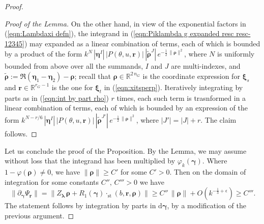 \documentclass[10pt,a4paper]{amsart}
\begin{document}
\begin{proof}
\begin{proof}[Proof of the Lemma]
On the other hand, in view of the exponential factors in (\ref{eqn:Lambdaxi defn}), the integrand in 
(\ref{eqn:Piklambda g expanded resc resc-12345})
may expanded as a linear combination of terms, each of which
is bounded by a product of the form
$k^N\,|\boldsymbol{\eta}^I|\,|P(\theta,u,\mathbf{r})|\,
\left|\tilde{\boldsymbol{\rho}}^J\right|\,
e^{-\frac{1}{2}\,\|\boldsymbol{\rho}\|^2}$, where $N$ is
uniformly bounded from above over all the summands,
$I$ and $J$ are multi-indexes, and 
$\tilde{\boldsymbol{\rho}}
:=
\Re(\boldsymbol{\eta}_1-\boldsymbol{\eta}_2)-\boldsymbol{\rho}$;
recall that $\boldsymbol{\rho}\in \mathbb{R}^{2\,n_G}$
is the coordinate expression for $\boldsymbol{\xi}_s$
and $\mathbf{r}\in \mathbb{R}^{r_G-1}$ is the one for
$\boldsymbol{\xi}_t$ in (\ref{eqn:xitsperp}).
Iteratively integrating by parts as in (\ref{eqn:int by part rho}) $r$ times, each such term is trasnformed in 
a linear combination of terms, each of which
is bounded by an expression of the form
$k^{N-r/6}\,|\boldsymbol{\eta}^I|\,|P(\theta,u,\mathbf{r})|\,
\left|\tilde{\boldsymbol{\rho}}^{J'}\right|\,
e^{-\frac{1}{2}\,\|\boldsymbol{\rho}\|^2}$,
where $|J'|=|J|+r$. 
%
The claim follows.





\end{proof}
Let us conclude the proof of the Proposition.
By the Lemma,
we may assume without loss that the integrand has been
multiplied by $\varphi_k(\boldsymbol{\gamma})$.
Where $1-\varphi(\boldsymbol{\rho})\neq 0$,
we have $\|\boldsymbol{\rho}\|\ge C'$ for some
$C'>0$. Then on the domain of integration
for some constants $C'',\,C'''>0$
we have
$$
\|\partial_{\boldsymbol{\gamma}}\Psi_{\mathbf{r}}\|=
\|Z_{\boldsymbol{\lambda}}\,
\boldsymbol{\rho}+R_1(\boldsymbol{\gamma})\cdot_{\mathrm{st}}
(b,\mathbf{r},\boldsymbol{\rho})\|
\ge C''\,\|\boldsymbol{\rho}\|
+O\left(k^{-\frac{1}{3}+\epsilon}  \right)
\ge C'''.
$$
%
The statement follows by integration by parts in 
$\mathrm{d}\boldsymbol{\gamma}$, by a modification of
the previous argument.
\end{proof}
\end{document}
